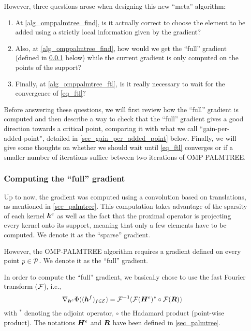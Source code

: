 \noindent
However, three questions arose when designing this new “meta” algorithm:
\begin{enumerate}[label={\alph*)},noitemsep]
	\item At \cref{alg_omppalmtree_find}, is it actually correct to choose the element to be added using a strictly local information given by the gradient?
	\item Also, at \cref{alg_omppalmtree_find}, how would we get the “full” gradient (defined in \cref{sec_full_grad} below) while the current gradient is only computed on the points of the support?
	\item Finally, at \cref{alg_omppalmtree_ftl}, is it really necessary to wait for the convergence of \eqref{eq_ftl}?
\end{enumerate}

\noindent
Before answering these questions, we will first review how the “full” gradient is computed and then describe a way to check that the “full” gradient gives a good direction towards a critical point, comparing it with what we call “gain-per-added-point”, detailed in \cref{sec_gain_per_added_point} below. Finally, we will give some thoughts on whether we should wait until \eqref{eq_ftl} converges or if a smaller number of iterations suffice between two iterations of OMP-PALMTREE.


\subsubsection{Computing the “full” gradient}\label{sec_full_grad}
Up to now, the gradient was computed using a convolution based on translations, as mentioned in \cref{sec_palmtree}. This computation takes advantage of the sparsity of each kernel $\h^e$ as well as the fact that the proximal operator is projecting every kernel onto its support, meaning that only a few elements have to be computed. We denote it as the “sparse” gradient.

\noindent
However, the OMP-PALMTREE algorithm requires a gradient defined on every point $p \in \P$. We denote it as the “full” gradient.

\noindent
In order to compute the “full” gradient, we basically chose to use the fast Fourier transform ($\F$), i.e., 
\begin{align*}
	\nabla_{\h^e} \Phi((\h^f)_{f \in \E})&= \F^{-1}(\F(\H^{e})^* \circ \F(\Res))
\end{align*}
with ${}^*$ denoting the adjoint operator, $\circ$ the Hadamard product (point-wise product). The notations $\H^e$ and $\Res$ have been defined in \cref{sec_palmtree}.

